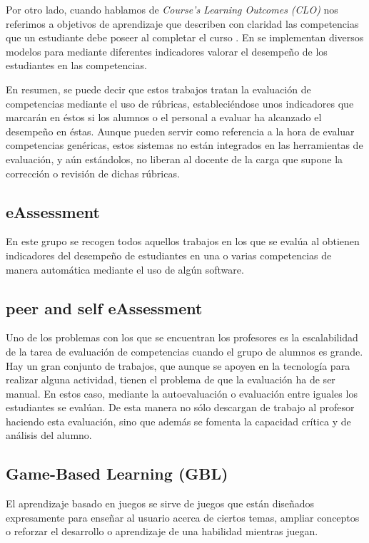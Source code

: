 Por otro lado, cuando hablamos de \emph{Course’s Learning Outcomes (CLO)} nos referimos a objetivos de aprendizaje que describen con claridad las competencias que un estudiante debe poseer al completar el curso \cite{SimonTaylor:2009, Anderson:2001,Kennedy:2007}. En \cite {Mohamed:2008,Mohamed:2008a,Rashid:2008} se implementan diversos modelos para mediante diferentes indicadores valorar el desempeño de los estudiantes en las competencias.

En resumen, se puede decir que estos trabajos tratan la evaluación de competencias mediante el uso de rúbricas, estableciéndose unos indicadores que marcarán en éstos si los alumnos o el personal a evaluar ha alcanzado el desempeño en éstas. Aunque pueden servir como referencia a la hora de evaluar competencias genéricas, estos sistemas no están integrados en las herramientas de evaluación, y aún estándolos, no liberan al docente de la carga que supone la corrección o revisión de dichas rúbricas.

\subsection{eAssessment}
En este grupo se recogen todos aquellos trabajos en los que se evalúa al obtienen indicadores del desempeño de estudiantes en una o varias competencias de manera automática mediante el uso de algún software. 
\subsection{peer and self eAssessment}
Uno de los problemas con los que se encuentran los profesores es la escalabilidad de la tarea de evaluación de competencias cuando el grupo de alumnos es grande. Hay un gran conjunto de trabajos, que aunque se apoyen en la tecnología para realizar alguna actividad, tienen el problema de que la evaluación ha de ser manual. En estos caso, mediante la autoevaluación o evaluación entre iguales los estudiantes se evalúan. De esta manera no sólo descargan de trabajo al profesor haciendo esta evaluación, sino que además se fomenta la capacidad crítica y de análisis del alumno.
\subsection{Game-Based Learning (GBL)}
El aprendizaje basado en juegos se sirve de juegos que están diseñados expresamente para enseñar al usuario acerca de ciertos temas, ampliar conceptos o reforzar el desarrollo o aprendizaje de una habilidad mientras juegan.
